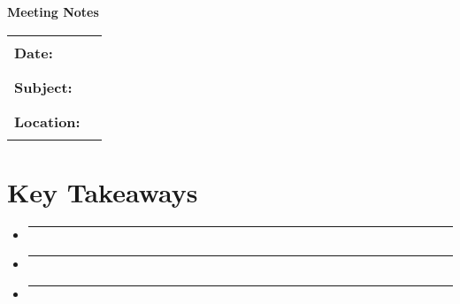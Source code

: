 \documentclass[a4paper,10pt]{article}
\begin{document}
\pagestyle{empty}

\begin{center}
    {\large\bfseries Meeting Notes}
    \vspace{0.2cm}
    
    \vspace{0.1cm}
    
    \begin{tabular}{@{}p{} p{}@{}}
        \textbf{Date:} & \rule{0.4\textwidth}{0.4pt} \\
        \textbf{Subject:} & \rule{0.4\textwidth}{0.4pt} \\
        \textbf{Location:} & \rule{0.4\textwidth}{0.4pt} \\
    \end{tabular}
\end{center}

\vspace{0.2cm}

\section*{Key Takeaways}
\begin{itemize}[leftmargin=*,label={}]
    \item \rule{0.9\textwidth}{0.4pt} \vspace{0.1cm}
    \item \rule{0.9\textwidth}{0.4pt} \vspace{0.1cm}
    \item \rule{0.9\textwidth}{0.4pt}
\end{itemize}

\vspace{0.2cm}

\end{document}
